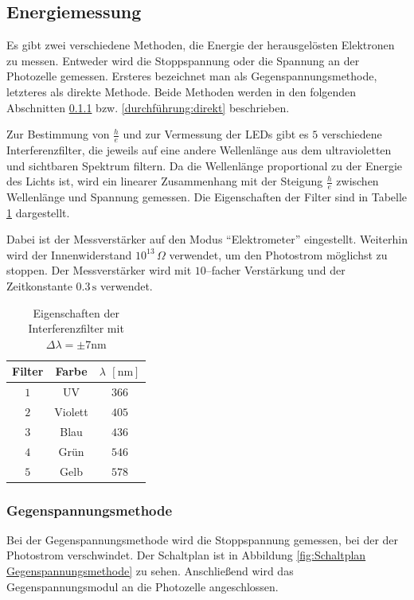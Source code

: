 \documentclass[12pt,a4paper]{scrartcl}
\numberwithin{equation}{section} %
\begin{document}
\subsection{Energiemessung}
\label{durchführung:Energiemessung}
Es gibt zwei verschiedene Methoden, die Energie der herausgelösten Elektronen zu messen. Entweder wird die Stoppspannung oder die Spannung an der Photozelle gemessen. Ersteres bezeichnet man als Gegenspannungsmethode, letzteres als direkte Methode. Beide Methoden werden in den folgenden Abschnitten \ref{durchführung:Gegenspannung} bzw. \ref{durchführung:direkt} beschrieben.

Zur Bestimmung von $\frac{h}{e}$ und zur Vermessung der LEDs gibt es $5$ verschiedene Interferenzfilter, die jeweils auf eine andere Wellenlänge aus dem ultravioletten und sichtbaren Spektrum filtern. Da die Wellenlänge proportional zu der Energie des Lichts ist, wird ein linearer Zusammenhang mit der Steigung $\frac{h}{e}$ zwischen Wellenlänge und Spannung gemessen. Die Eigenschaften der Filter sind in Tabelle \ref{tab:Interferenzfilter} dargestellt.

Dabei ist der Messverstärker auf den Modus ``Elektrometer'' eingestellt. Weiterhin wird der Innenwiderstand $10^{13}\,\Omega$ verwendet, um den Photostrom möglichst zu stoppen. Der Messverstärker wird mit $10$--facher Verstärkung und der Zeitkonstante $0.3\mathrm{\,s}$  verwendet.

\begin{table}[h!]
	\centering
	\begin{tabular}{c|c|c}
		Filter & Farbe & $\lambda$ $[\mathrm{nm}]$ \\
		\hline
		$1$ & UV & $366$ \\
		$2$ & Violett & $405$ \\
		$3$ & Blau & $436$ \\
		$4$ & Grün & $546$ \\
		$5$ & Gelb & $578$ \\
	\end{tabular}
	\caption{Eigenschaften der Interferenzfilter mit $\Delta \lambda = \pm 7\mathrm{nm}$}
	\label{tab:Interferenzfilter}
\end{table}

\subsubsection{Gegenspannungsmethode}
\label{durchführung:Gegenspannung}

Bei der Gegenspannungsmethode wird die Stoppspannung gemessen, bei der der Photostrom verschwindet.  Der Schaltplan ist in Abbildung \ref{fig:Schaltplan Gegenspannungsmethode} zu sehen. Anschließend wird das Gegenspannungsmodul an die Photozelle angeschlossen.
\end{document}
